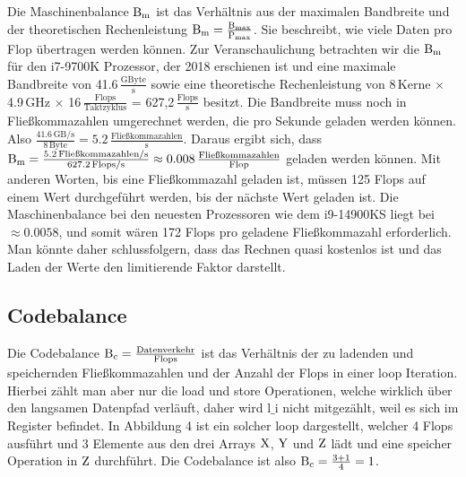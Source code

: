 \documentclass[sigconf,language=ngerman]{acmart}
\begin{document}
    Die Maschinenbalance $\textnormal{B}_{\textnormal{m}}$ ist das Verhältnis 
    aus der maximalen Bandbreite und der theoretischen Rechenleistung
    $\textnormal{B}_{\textnormal{m}} = \frac{\textnormal{B}_{\textnormal{max}}}{\textnormal{P}_{\textnormal{max}}}$.
    Sie beschreibt, wie viele Daten pro Flop übertragen werden können. Zur Veranschaulichung 
    betrachten wir die $\textnormal{B}_{\textnormal{m}}$ für den i7-9700K Prozessor,     %
    der 2018 erschienen ist und eine maximale Bandbreite von 41.6\,$\frac{\text{GByte}}{\text{s}}$ sowie
    eine theoretische Rechenleistung von 8\,Kerne $\times$ 4.9\,GHz $\times$ 16\,$\frac{\text{Flops}}{\text{Taktzyklus}}$ = 627,2\,$\frac{\text{Flops}}{\text{s}}$ besitzt.
    Die Bandbreite muss noch in Fließkommazahlen umgerechnet werden, die pro Sekunde geladen werden können. Also
    $\frac{41.6 \, \text{GB/s}}{8 \, \text{Byte}} = 5.2 \, \frac{\text{Fließkommazahlen}}{\text{s}}$.
    Daraus ergibt sich, dass $\textnormal{B}_{\textnormal{m}} = \frac{5.2 \, \textnormal{Fließkommazahlen/s}}{627.2 \, \textnormal{Flops/s}} \approx 0.008\,\frac{\textnormal{Fließkommazahlen}}{\textnormal{Flop}}$
    geladen werden können. Mit anderen Worten, bis eine Fließkommazahl geladen ist, müssen
    125 Flops auf einem Wert durchgeführt werden, bis der nächste Wert geladen ist. 
    Die Maschinenbalance bei den neuesten Prozessoren wie dem i9-14900KS liegt bei $\approx 0.0058$, und somit wären 
    172 Flops pro geladene Fließkommazahl erforderlich. Man könnte daher schlussfolgern, 
    dass das Rechnen quasi kostenlos ist und das Laden der Werte den limitierende Faktor darstellt.

    \subsection{Codebalance}
    Die Codebalance $\textnormal{B}_{\textnormal{c}} = \frac{\textnormal{Datenverkehr}}{\textnormal{Flops}}$ ist das Verhältnis
    der zu ladenden und speichernden Fließkommazahlen und der Anzahl der Flops in einer loop Iteration. 
    Hierbei zählt man aber nur die load und store Operationen, welche wirklich über den langsamen Datenpfad verläuft, daher wird $\text{l\_i}$ nicht mitgezählt,
    weil es sich im Register befindet.
    In Abbildung 4 ist ein solcher loop dargestellt, %
    welcher 4 Flops ausführt und 3 Elemente aus den drei Arrays $\textnormal{X}$, $\textnormal{Y}$ und $\textnormal{Z}$ lädt 
    und eine speicher Operation in $\textnormal{Z}$ durchführt. Die Codebalance ist also $\textnormal{B}_{\textnormal{c}} = \frac{3+1}{4} = 1$. 
\end{document}
